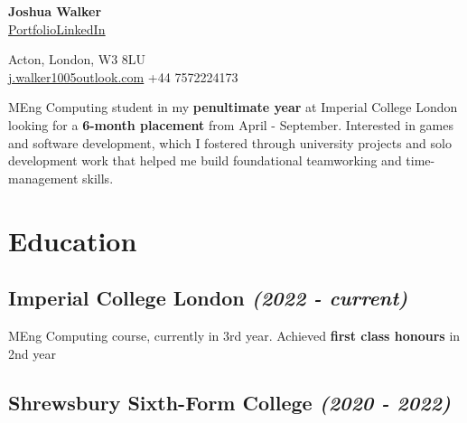\documentclass{article}
\makeatletter
\newcommand{\contact}[1]{\normalsize{#1}}
\newcommand{\contactdiv}{\hspace*{0.8em}}
\newcommand{\email}[2]{\href{mailto:#1@#2}{\underline{#1{\small\fontfamily{phv}\selectfont@}#2}}}
\newcommand{\linkedin}{\href{https://www.linkedin.com/in/joshua-walker-080714238/}{\underline{LinkedIn}}}
\newcommand{\portfolio}{\href{https://josh-ja-walker.github.io/portfolio/}{\underline{Portfolio}}}
\newcommand{\dates}[1]{\hfill\textit{(#1)}}
\newcommand{\tab}{\hspace{1.5em}}
\makeatother
\begin{document}
\begin{multicols}{2}

    \begin{flushleft}
        {\LARGE\textbf{Joshua Walker}}\\
        \vspace{0.5em}
        \portfolio\contactdiv\linkedin
    \end{flushleft}
    
    \columnbreak
    
    \begin{flushright}
        \contact{Acton, London, W3 8LU}\\
        \vspace{0.5em}
        \contact{\email{j.walker1005}{outlook.com}}
        \contactdiv
        \contact{+44 7572224173}
    \end{flushright}
    
\end{multicols}

\vspace{0.8em}

{\noindent}MEng Computing student in my \textbf{penultimate year} at Imperial College London looking for a \textbf{6-month placement} from April - September. 
Interested in games and software development, which I fostered through university projects and solo development work 
that helped me build foundational teamworking and time-management skills. 

\vspace{0.15em}


\section*{Education}

\subsection*{\textbf{Imperial College London} \dates{2022 - current}}

{\tab}MEng Computing course, currently in 3rd year. Achieved \textbf{first class honours} in 2nd year


\subsection*{\textbf{Shrewsbury Sixth-Form College} \dates{2020 - 2022}}
\end{document}
